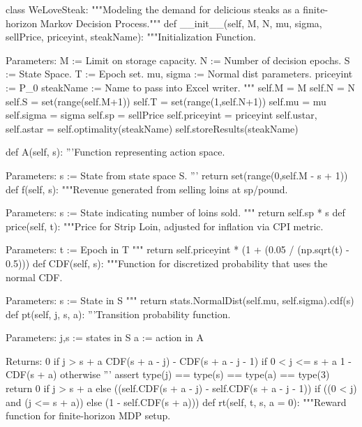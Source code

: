 \documentclass[12pt,a4paper]{article}
\begin{document}
\begin{python}
class WeLoveSteak:
    """Modeling the demand for delicious steaks as a finite-horizon Markov Decision Process."""
    def __init__(self, M, N, mu, sigma, sellPrice, priceyint, steakName):
        """Initialization Function.
        
        Parameters:
        M := Limit on storage capacity.
        N := Number of decision epochs.
        S := State Space. T := Epoch set.
        mu, sigma := Normal dist parameters.
        priceyint := P_0
        steakName := Name to pass into Excel writer.
        """
        self.M = M
        self.N = N
        self.S = set(range(self.M+1))
        self.T = set(range(1,self.N+1))
        self.mu = mu
        self.sigma = sigma
        self.sp = sellPrice
        self.priceyint = priceyint
        self.ustar, self.astar = self.optimality(steakName)
        self.storeResults(steakName)
        
    def A(self, s):
        '''Function representing action space.
        
        Parameters:
        s := State from state space S.
        '''
        return set(range(0,self.M - s + 1))
    def f(self, s):
        """Revenue generated from selling loins at sp/pound.
        
        Parameters:
        s := State indicating number of loins sold.
        """
        return self.sp * s
    def price(self, t):
        """Price for Strip Loin, adjusted for inflation via CPI metric.
        
        Parameters:
        t := Epoch in T
        """
        return self.priceyint * (1 + (0.05 / (np.sqrt(t) - 0.5)))
    def CDF(self, s):
        """Function for discretized probability that uses the normal CDF.
        
        Parameters:
        s := State in S
        """
        return stats.NormalDist(self.mu, self.sigma).cdf(s)
    def pt(self, j, s, a):
        '''Transition probability function.
            
        Parameters:
        j,s := states in S
        a := action in A
        
        Returns:
        0 if j > s + a
        CDF(s + a - j) - CDF(s + a - j - 1) if 0 < j <= s + a
        1 - CDF(s + a) otherwise
        '''
        assert type(j) == type(s) == type(a) == type(3)
        return 0 if j > s + a else 
        ((self.CDF(s + a - j) - self.CDF(s + a - j - 1)) 
          if ((0 < j) and (j <= s + a)) 
          else (1 - self.CDF(s + a)))
    def rt(self, t, s, a = 0):
        """Reward function for finite-horizon MDP setup.
        

\end{python}
\end{document}
